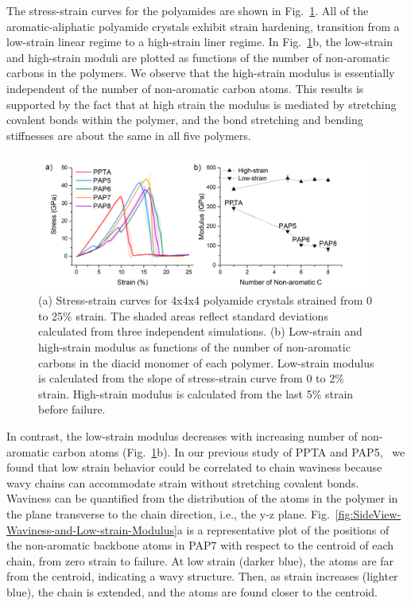 \documentclass[journal=langd5,manuscript=article]{achemso}
\begin{document}
The stress-strain curves for the polyamides are shown in Fig.~\ref{fig:Stress-strain-Curves-and-Modulus}. 
All of the aromatic-aliphatic polyamide crystals exhibit strain hardening, transition from a low-strain linear regime to a high-strain liner regime. 
In Fig.~\ref{fig:Stress-strain-Curves-and-Modulus}b, the low-strain and high-strain moduli are plotted as functions of the number of non-aromatic carbons in the polymers.
We observe that the high-strain modulus is essentially independent of the number of non-aromatic carbon atoms.  This results is supported by the fact that at high strain the modulus is mediated by stretching covalent bonds within the polymer, and the bond stretching and bending stiffnesses are about the same in all five polymers.
\begin{figure}[h!]
\centering
\includegraphics[scale=0.45]{Stress-strain-Curves-and-Modulus.png}
\caption{(a) Stress-strain curves for 4x4x4 polyamide crystals strained from 0 to 25\% strain. The shaded areas reflect standard deviations calculated from three independent simulations. (b) Low-strain and high-strain modulus as functions of the number of non-aromatic carbons in the diacid monomer of each polymer. Low-strain modulus is calculated from the slope of stress-strain curve from 0 to 2\% strain. High-strain modulus is calculated from the last 5\% strain before failure. }
\label{fig:Stress-strain-Curves-and-Modulus}
\end{figure}


In contrast, the low-strain modulus decreases with increasing number of non-aromatic carbon atoms (Fig.~\ref{fig:Stress-strain-Curves-and-Modulus}b).
In our previous study of PPTA and PAP5,~\cite{yang2021molecular} we found that low strain behavior could be correlated to chain waviness because wavy chains can accommodate strain without stretching covalent bonds.
Waviness can be quantified from the distribution of the atoms in the polymer in the plane transverse to the chain direction, i.e., the y-z plane.
Fig.~\ref{fig:SideView-Waviness-and-Low-strain-Modulus}a is a representative plot of the positions of the non-aromatic backbone atoms in PAP7 with respect to the centroid of each chain, from zero strain to failure.
At low strain (darker blue), the atoms are far from the centroid, indicating a wavy structure.
Then, as strain increases (lighter blue), the chain is extended, and the atoms are found closer to the centroid.
\end{document}

